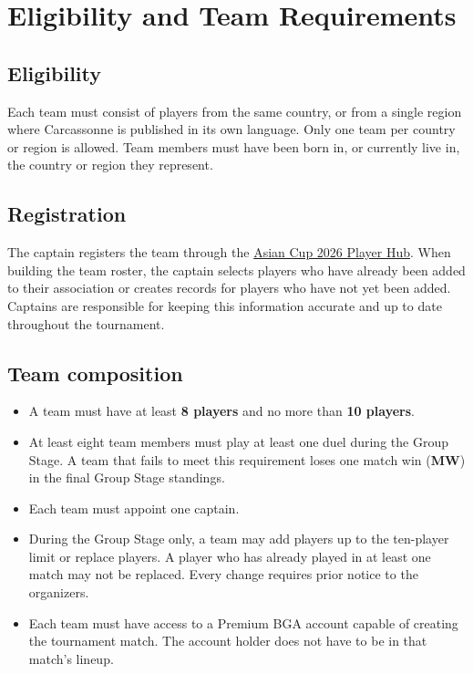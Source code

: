\documentclass[10pt,a4paper]{article}
\newcommand{\term}[1]{\textbf{#1}}
\newcommand{\PlayerHub}{\href{https://carcassonne.gg/player-hub/tournaments/?id=Asian-Cup-2026}{Asian Cup 2026 Player Hub}}
\begin{document}
\section{Eligibility and Team Requirements}

\subsection{Eligibility}

Each team must consist of players from the same country, or from a single region
where Carcassonne is published in its own language. Only one team per
country or region is allowed. Team members must have been born in, or currently
live in, the country or region they represent.

\subsection{Registration}

The captain registers the team through the \PlayerHub. When building the team
roster, the captain selects players who have already been added to their
association or creates records for players who have not yet been added.
Captains are responsible for keeping this information accurate and up to date
throughout the tournament.

\subsection{Team composition}

\begin{itemize}
  \item A team must have at least \term{8 players} and no more than
        \term{10 players}.
  \item At least eight team members must play at least one duel during the Group
        Stage. A team that fails to meet this requirement loses one match win
        (\term{MW}) in the final Group Stage standings.
  \item Each team must appoint one captain.
  \item During the Group Stage only, a team may add players up to the ten-player
        limit or replace players. A player who has already played in at least
        one match may not be replaced. Every change requires prior notice to
        the organizers.
  \item Each team must have access to a Premium BGA account capable of creating
        the tournament match. The account holder does not have to be in that
        match's lineup.
\end{itemize}
\end{document}
